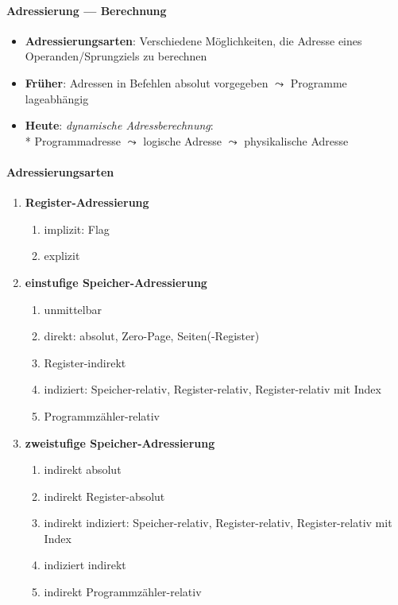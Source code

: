 \paragraph{Adressierung --- Berechnung}
\begin{itemize}
	\item \textbf{Adressierungsarten}: Verschiedene Möglichkeiten, die Adresse eines Operanden/Sprungziels zu berechnen
	\item \textbf{Früher}: Adressen in Befehlen absolut vorgegeben $\leadsto$ Programme lageabhängig
	\item \textbf{Heute}: \emph{dynamische Adressberechnung}: \\*
		Programmadresse $\leadsto$ logische Adresse $\leadsto$ physikalische Adresse
\end{itemize}

\paragraph{Adressierungsarten}
\begin{enumerate}
	\item \textbf{Register-Adressierung}
	\begin{enumerate}
		\item implizit: Flag
		\item explizit
	\end{enumerate}
	\item \textbf{einstufige Speicher-Adressierung}
	\begin{enumerate}
		\item unmittelbar
		\item direkt: absolut, Zero-Page, Seiten(-Register)
		\item Register-indirekt
		\item indiziert: Speicher-relativ, Register-relativ, Register-relativ mit Index
		\item Programmzähler-relativ
	\end{enumerate}
	\item \textbf{zweistufige Speicher-Adressierung}
	\begin{enumerate}
		\item indirekt absolut
		\item indirekt Register-absolut
		\item indirekt indiziert: Speicher-relativ, Register-relativ, Register-relativ mit Index
		\item indiziert indirekt
		\item indirekt Programmzähler-relativ
	\end{enumerate}
\end{enumerate}

